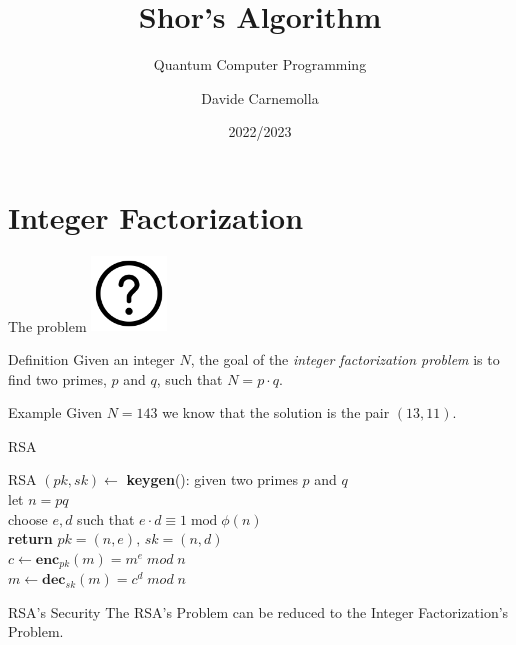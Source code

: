 \documentclass{beamer}
\title{Shor's Algorithm}
\subtitle{Quantum Computer Programming}
\author{Davide Carnemolla}
\institute{Department of Mathematics and \\ Computer Science \\ \\ University of Catania}
\date{2022/2023}
\begin{document}
    \begin{frame}
        \maketitle
    \end{frame}
    
    \section{Integer Factorization}

    \begin{frame}{The problem}
        \centering
        \includegraphics[height=2cm,keepaspectratio]{images/problem.pdf}
        \vspace{1cm}
        \begin{block}{Definition}
            Given an integer $N$, the goal of the \textit{integer factorization problem} is to find two primes, $p$ and $q$, such that $N = p \cdot q$.
        \end{block}
        \begin{exampleblock}{Example}
            Given $N = 143$ we know that the solution is the pair $(13, 11).$
        \end{exampleblock}
        
    \end{frame}

    \begin{frame}{RSA}
        \centering
        \begin{block}{RSA}
            $(pk,sk) \leftarrow$ \textbf{keygen}(): \hspace{0.05cm} given two primes $p$ and $q$ \\ 
                \hspace{3.7cm} let $n = pq$ \\ 
                \hspace{3.7cm} choose $e,d$ such that $e \cdot d \equiv 1 \; \text{mod} \; \phi(n)$ \\
                \hspace{3.7cm} \textbf{return} $pk = (n,e), \, sk = (n, d)$ \\
            \vspace{0.5cm}
            $c \leftarrow \textbf{enc}_{pk}(m) = m^e \; mod \; n$ \\
            \vspace{0.5cm}
            $m \leftarrow \textbf{dec}_{sk}(m) = c^d \; mod \; n$
        \end{block}
        \begin{alertblock}{RSA's Security}
            The RSA's Problem can be reduced to the Integer Factorization's Problem.
        \end{alertblock}
    \end{frame}
\end{document}
